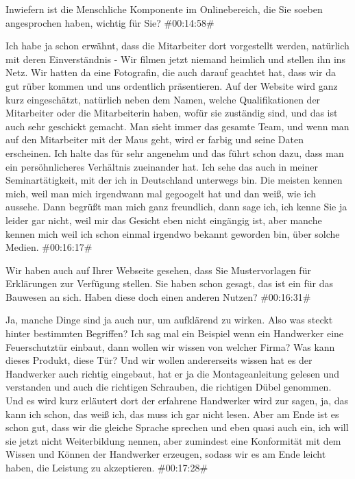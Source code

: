 \begin{description}
\Fabian Inwiefern ist die Menschliche Komponente im Onlinebereich, die Sie soeben angesprochen haben, wichtig für Sie? \#00:14:58\#

\Andre Ich habe ja schon erwähnt, dass die Mitarbeiter dort vorgestellt werden, natürlich mit deren Einverständnis - Wir filmen jetzt niemand heimlich und stellen ihn ins Netz. Wir hatten da eine Fotografin, die auch darauf geachtet hat, dass wir da gut rüber kommen und uns ordentlich präsentieren. Auf der Website wird ganz kurz eingeschätzt, natürlich neben dem Namen, welche Qualifikationen der Mitarbeiter oder die Mitarbeiterin haben, wofür sie zuständig sind, und das ist auch sehr geschickt gemacht. Man sieht immer das gesamte Team, und wenn man auf den Mitarbeiter mit der Maus geht, wird er farbig und seine Daten erscheinen. Ich halte das für sehr angenehm und das führt schon dazu, dass man ein persöhnlicheres Verhältnis zueinander hat. Ich sehe das auch in meiner Seminartätigkeit, mit der ich in Deutschland unterwegs bin. Die meisten kennen mich, weil man mich irgendwann mal gegoogelt hat und dan weiß, wie ich aussehe. Dann begrüßt man mich ganz freundlich, dann sage ich, ich kenne Sie ja leider gar nicht, weil mir das Gesicht eben nicht eingängig ist, aber manche kennen mich weil ich schon einmal irgendwo bekannt geworden bin, über solche Medien. \#00:16:17\#

\Fabian Wir haben auch auf Ihrer Webseite gesehen, dass Sie Mustervorlagen für Erklärungen zur Verfügung stellen. Sie haben schon gesagt, das ist ein für das Bauwesen an sich. Haben diese doch einen anderen Nutzen? \#00:16:31\#

\Andre Ja, manche Dinge sind ja auch nur, um aufklärend zu wirken. Also was steckt hinter bestimmten Begriffen? Ich sag mal ein Beispiel wenn ein Handwerker eine Feuerschutztür einbaut, dann wollen wir wissen von welcher Firma? Was kann dieses Produkt, diese Tür? Und wir wollen andererseits wissen hat es der Handwerker auch richtig eingebaut, hat er ja die Montageanleitung gelesen und verstanden und auch die richtigen Schrauben, die richtigen Dübel genommen. Und es wird kurz erläutert dort der erfahrene Handwerker wird zur sagen, ja, das kann ich schon, das weiß ich, das muss ich gar nicht lesen. Aber am Ende ist es schon gut, dass wir die gleiche Sprache sprechen und eben quasi auch ein, ich will sie jetzt nicht Weiterbildung nennen, aber zumindest eine Konformität mit dem Wissen und Können der Handwerker erzeugen, sodass wir es am Ende leicht haben, die Leistung zu akzeptieren. \#00:17:28\#


\end{description}
